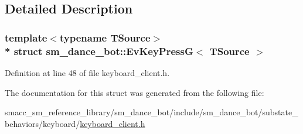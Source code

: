 \subsection{Detailed Description}
\subsubsection*{template$<$typename T\+Source$>$\\*
struct sm\+\_\+dance\+\_\+bot\+::\+Ev\+Key\+Press\+G$<$ T\+Source $>$}



Definition at line 48 of file keyboard\+\_\+client.\+h.



The documentation for this struct was generated from the following file\+:\begin{DoxyCompactItemize}
\item 
smacc\+\_\+sm\+\_\+reference\+\_\+library/sm\+\_\+dance\+\_\+bot/include/sm\+\_\+dance\+\_\+bot/substate\+\_\+behaviors/keyboard/\hyperlink{keyboard__client_8h}{keyboard\+\_\+client.\+h}\end{DoxyCompactItemize}
